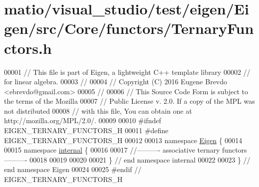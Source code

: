 \hypertarget{matio_2visual__studio_2test_2eigen_2_eigen_2src_2_core_2functors_2_ternary_functors_8h_source}{}\section{matio/visual\+\_\+studio/test/eigen/\+Eigen/src/\+Core/functors/\+Ternary\+Functors.h}
\label{matio_2visual__studio_2test_2eigen_2_eigen_2src_2_core_2functors_2_ternary_functors_8h_source}

\begin{DoxyCode}
00001 \textcolor{comment}{// This file is part of Eigen, a lightweight C++ template library}
00002 \textcolor{comment}{// for linear algebra.}
00003 \textcolor{comment}{//}
00004 \textcolor{comment}{// Copyright (C) 2016 Eugene Brevdo <ebrevdo@gmail.com>}
00005 \textcolor{comment}{//}
00006 \textcolor{comment}{// This Source Code Form is subject to the terms of the Mozilla}
00007 \textcolor{comment}{// Public License v. 2.0. If a copy of the MPL was not distributed}
00008 \textcolor{comment}{// with this file, You can obtain one at http://mozilla.org/MPL/2.0/.}
00009 
00010 \textcolor{preprocessor}{#ifndef EIGEN\_TERNARY\_FUNCTORS\_H}
00011 \textcolor{preprocessor}{#define EIGEN\_TERNARY\_FUNCTORS\_H}
00012 
00013 \textcolor{keyword}{namespace }\hyperlink{namespace_eigen}{Eigen} \{
00014 
00015 \textcolor{keyword}{namespace }\hyperlink{namespaceinternal}{internal} \{
00016 
00017 \textcolor{comment}{//---------- associative ternary functors ----------}
00018 
00019 
00020 
00021 \} \textcolor{comment}{// end namespace internal}
00022 
00023 \} \textcolor{comment}{// end namespace Eigen}
00024 
00025 \textcolor{preprocessor}{#endif // EIGEN\_TERNARY\_FUNCTORS\_H}
\end{DoxyCode}
